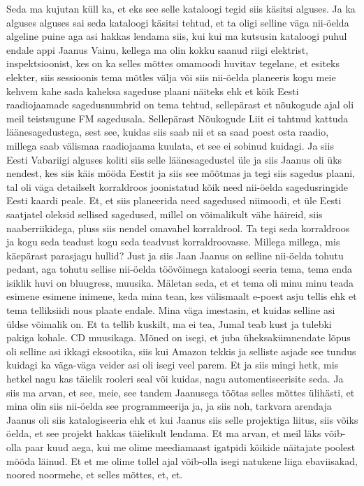 Seda ma kujutan küll ka, et eks see selle kataloogi tegid siis käsitsi alguses.
Ja ka alguses alguses sai seda kataloogi käsitsi tehtud, et ta oligi selline väga nii-öelda algeline puine aga asi hakkas lendama siis, kui kui ma kutsusin kataloogi puhul endale appi Jaanus Vainu, kellega ma olin kokku saanud riigi elektrist, inspektsioonist, kes on ka selles mõttes omamoodi huvitav tegelane, et esiteks elekter, siis sessioonis tema mõtles välja või siis nii-öelda planeeris kogu meie kehvem kahe sada kaheksa sageduse plaani näiteks ehk et kõik Eesti raadiojaamade sagedusnumbrid on tema tehtud, sellepärast et nõukogude ajal oli meil teistsugune FM sagedusala. Sellepärast Nõukogude Liit ei tahtnud kattuda läänesagedustega, sest see, kuidas siis saab nii et sa saad poest osta raadio, millega saab välismaa raadiojaama kuulata, et see ei sobinud kuidagi. Ja siis Eesti Vabariigi alguses koliti siis selle läänesagedustel üle ja siis Jaanus oli üks nendest, kes siis käis mööda Eestit ja siis see mõõtmas ja tegi siis sagedus plaani, tal oli väga detailselt korraldroos joonistatud kõik need nii-öelda sagedusringide Eesti kaardi peale. Et, et siis planeerida need sagedused niimoodi, et üle Eesti saatjatel oleksid sellised sagedused, millel on võimalikult vähe häireid, siis naaberriikidega, pluss siis nendel omavahel korraldrool. Ta tegi seda korraldroos ja kogu seda teadust kogu seda teadvust korraldroovasse.
Millega millega, mis käepärast parasjagu hullid?
Just ja siis Jaan Jaanus on selline nii-öelda tohutu pedant, aga tohutu sellise nii-öelda töövõimega kataloogi seeria tema, tema enda isiklik huvi on bluugress, muusika. Mäletan seda, et et tema oli minu minu teada esimene esimene inimene, keda mina tean, kes välismaalt e-poest asju tellis ehk et tema telliksiidi nous plaate endale. Mina väga imestasin, et kuidas selline asi üldse võimalik on. Et ta tellib kuskilt, ma ei tea, Jumal teab kust ja tulebki pakiga kohale. CD muusikaga.
Mõned on isegi, et juba üheksakümnendate lõpus oli selline asi ikkagi eksootika, siis kui Amazon tekkis ja selliste asjade see tundus kuidagi ka väga-väga veider asi oli isegi veel parem. Et ja siis mingi hetk, mis hetkel nagu kas täielik rooleri seal või kuidas, nagu automentiseerisite seda.
Ja siis ma arvan, et see, meie, see tandem Jaanusega töötas selles mõttes ülihästi, et mina olin siis nii-öelda see programmeerija ja, ja siis noh, tarkvara arendaja Jaanus oli siis katalogiseeria ehk et kui Jaanus siis selle projektiga liitus, siis võiks öelda, et see projekt hakkas täielikult lendama. Et ma arvan, et meil läks võib-olla paar kuud aega, kui me olime meediamaast igatpidi kõikide näitajate poolest mööda läinud. Et et me olime tollel ajal võib-olla isegi natukene liiga ebaviisakad, noored noormehe, et selles mõttes, et, et.
